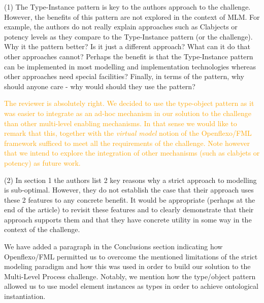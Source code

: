 \documentclass[10pt]{article}
\begin{document}
\pagebreak


\begin{response}{(1) The Type-Instance pattern is key to the authors approach to the challenge. However, the benefits of this pattern are not explored in the context of MLM. For example, the authors do not really explain approaches such as Clabjects or potency levels as they compare to the Type-Instance pattern (or the challenge). Why it the pattern better? Is it just a different approach? What can it do that other approaches cannot? Perhaps the benefit is that the Type-Instance pattern can be implemented in most modelling and implementation technologies whereas other approaches need special facilities? Finally, in terms of the pattern, why should anyone care - why would should they use the pattern?}

\textcolor{orange}{The reviewer is absolutely right. We decided to use the type-object pattern as it was easier to integrate as an ad-hoc mechanism in our solution to the challenge than other multi-level enabling mechanisms. In that sense we would like to remark that this, together with the \emph{virtual model} notion of the Openflexo/FML framework sufficed to meet all the requirements of the challenge. Note however that we intend to explore the integration of other mechanisms (such as clabjets or potency) as future work.}

\end{response}

\begin{response}{(2) In section 1 the authors list 2 key reasons why a strict approach to modelling is sub-optimal. However, they do not establish the case that their approach uses these 2 features to any concrete benefit. It would be appropriate (perhaps at the end of the article) to revisit these features and to clearly demonstrate that their approach supports them and that they have concrete utility in some way in the context of the challenge.}

We have added a paragraph in the Conclusions section indicating how Openflexo/FML permitted us to overcome the mentioned limitations of the strict modeling paradigm and how this was used in order to build our solution to the Multi-Level Process challenge. Notably, we mention how the type/object pattern allowed us to use model element instances as types in order to achieve ontological instantiation.
\end{response}
\end{document}
